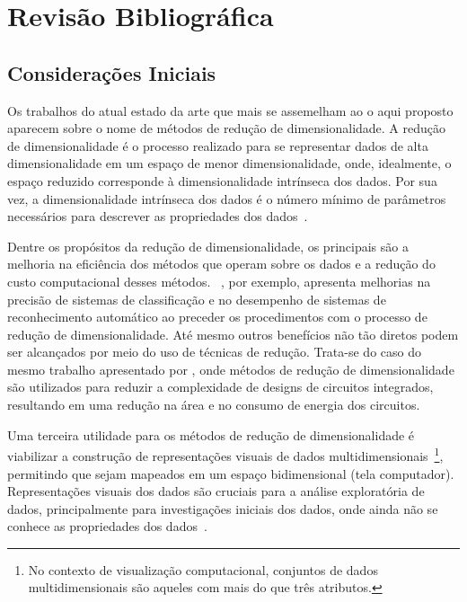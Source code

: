 \chapter{Revisão Bibliográfica}\label{chap:revisao}

\section{Considerações Iniciais}


Os trabalhos do atual estado da arte que mais se assemelham ao o aqui proposto aparecem sobre o nome de métodos de redução de dimensionalidade. 
A redução de dimensionalidade é o processo realizado para se representar dados de alta dimensionalidade em um espaço de menor dimensionalidade, onde, idealmente, o espaço reduzido corresponde à dimensionalidade intrínseca dos dados. 
Por sua vez, a dimensionalidade intrínseca dos dados é o número mínimo de parâmetros necessários para descrever as propriedades dos dados~\cite{Fukunaga1990}.

Dentre os propósitos da redução de dimensionalidade, os principais são a melhoria na eficiência dos métodos que operam sobre os dados e a redução do custo computacional desses métodos.  
\citeauthor{Konig2000}~\cite{Konig2000}, por exemplo, apresenta melhorias na precisão de sistemas de classificação e no desempenho de sistemas de reconhecimento automático ao preceder os procedimentos com o processo de redução de dimensionalidade. 
Até mesmo outros benefícios não tão diretos podem ser alcançados por meio do uso de técnicas de redução. 
Trata-se do caso do mesmo trabalho apresentado por \citeauthor{Konig2000}, onde métodos de redução de dimensionalidade são utilizados para reduzir a complexidade de designs de circuitos integrados, resultando em uma redução na área e no consumo de energia dos circuitos.

Uma terceira utilidade para os métodos de redução de dimensionalidade é viabilizar a construção de representações visuais de dados multidimensionais~\footnote{No contexto de visualização computacional, conjuntos de dados multidimensionais são aqueles com mais do que três atributos.}, permitindo que sejam mapeados em um espaço bidimensional (tela computador).
Representações visuais dos dados são cruciais para a análise exploratória de dados, principalmente para investigações iniciais dos dados, onde ainda não se conhece as propriedades dos dados~\cite{Kaski2011}. 

